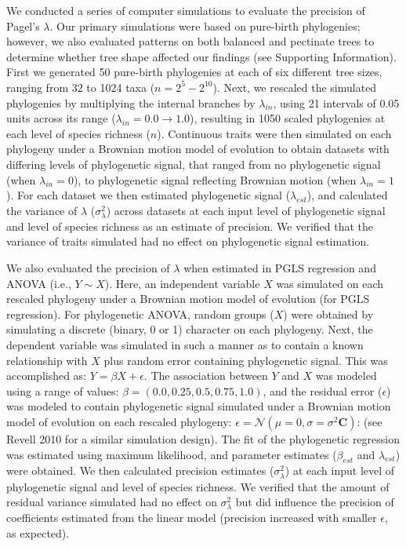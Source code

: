 \documentclass[
]{article}
\begin{document}
We conducted a series of computer simulations to evaluate the precision
of Pagel's \(\lambda\). Our primary simulations were based on pure-birth
phylogenies; however, we also evaluated patterns on both balanced and
pectinate trees to determine whether tree shape affected our findings
(see Supporting Information). First we generated 50 pure-birth
phylogenies at each of six different tree sizes, ranging from 32 to 1024
taxa (\(n=2^5 - 2^{10}\)). Next, we rescaled the simulated phylogenies
by multiplying the internal branches by \(\lambda_{in}\), using 21
intervals of 0.05 units across its range
(\(\lambda_{in} = 0.0 \to 1.0\)), resulting in 1050 scaled phylogenies
at each level of species richness (\(n\)). Continuous traits were then
simulated on each phylogeny under a Brownian motion model of evolution
to obtain datasets with differing levels of phylogenetic signal, that
ranged from no phylogenetic signal (when \(\lambda_{in} =0\)), to
phylogenetic signal reflecting Brownian motion (when
\(\lambda_{in} =1\)). For each dataset we then estimated phylogenetic
signal (\(\lambda_{est}\)), and calculated the variance of \(\lambda\)
(\(\sigma^2_\lambda\)) across datasets at each input level of
phylogenetic signal and level of species richness as an estimate of
precision. We verified that the variance of traits simulated had no
effect on phylogenetic signal estimation. \hfill\break

We also evaluated the precision of \(\lambda\) when estimated in PGLS
regression and ANOVA (i.e., \(Y\sim{X}\)). Here, an independent variable
\(X\) was simulated on each rescaled phylogeny under a Brownian motion
model of evolution (for PGLS regression). For phylogenetic ANOVA, random
groups (\(X\)) were obtained by simulating a discrete (binary, 0 or 1)
character on each phylogeny. Next, the dependent variable was simulated
in such a manner as to contain a known relationship with \(X\) plus
random error containing phylogenetic signal. This was accomplished as:
\(Y=\beta{X}+\epsilon\). The association between \(Y\) and \(X\) was
modeled using a range of values: \(\beta=(0.0,0.25, 0.5, 0.75,1.0)\),
and the residual error (\(\epsilon\)) was modeled to contain
phylogenetic signal simulated under a Brownian motion model of evolution
on each rescaled phylogeny:
\(\epsilon=\mathcal{N}(\mu=0,\sigma=\sigma^2\mathbf{C})\): (see Revell
2010 for a similar simulation design). The fit of the phylogenetic
regression was estimated using maximum likelihood, and parameter
estimates (\(\beta_{est}\) and \(\lambda_{est}\)) were obtained. We then
calculated precision estimates (\(\sigma^2_\lambda\)) at each input
level of phylogenetic signal and level of species richness. We verified
that the amount of residual variance simulated had no effect on
\(\sigma^2_\lambda\) but did influence the precision of coefficients
estimated from the linear model (precision increased with smaller
\(\epsilon\), as expected). \hfill\break
\end{document}
